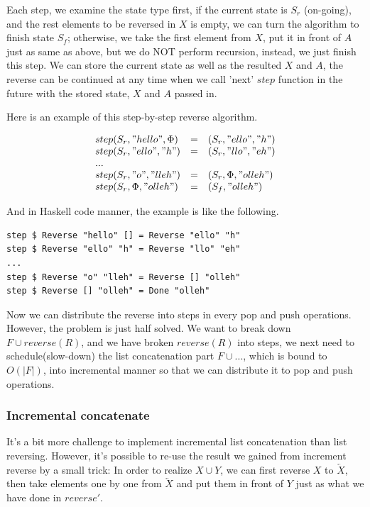 \documentclass[UTF8]{article}
\begin{document}
Each step, we examine the state type first, if the current state is
$S_r$ (on-going), and the rest elements to be reversed in $X$ is
empty, we can turn the algorithm to finish state $S_f$; otherwise,
we take the first element from $X$, put it in front of $A$ just
as same as above, but we do NOT perform recursion, instead, we
just finish this
step. We can store the current state as well as the resulted $X$
and $A$, the reverse can be continued at any time when we call 'next'
$step$ function in the future with the stored state, $X$ and $A$
passed in.

Here is an example of this step-by-step reverse algorithm.

\[
\begin{array}{lcl}
step(S_r, "hello", \Phi) & = & (S_r, "ello", "h") \\
step(S_r, "ello", "h") & = & (S_r, "llo", "eh") \\
... & & \\
step(S_r, "o", "lleh") & = & (S_r, \Phi, "olleh") \\
step(S_r, \Phi, "olleh") & = & (S_f, "olleh")
\end{array}
\]

And in Haskell code manner, the example is like the following.

\lstset{language=Haskell}
\begin{lstlisting}
step $ Reverse "hello" [] = Reverse "ello" "h"
step $ Reverse "ello" "h" = Reverse "llo" "eh"
...
step $ Reverse "o" "lleh" = Reverse [] "olleh"
step $ Reverse [] "olleh" = Done "olleh"
\end{lstlisting}

Now we can distribute the reverse into steps in every pop and push
operations. However, the problem is just half solved. We want to
break down $ F \cup reverse(R)$, and we have broken $reverse(R)$
into steps, we next need to schedule(slow-down) the list concatenation
part $F \cup ...$, which is bound to $O(|F|)$, into incremental
manner so that we can distribute it to pop and push operations.

\subsubsection{Incremental concatenate}

It's a bit more challenge to implement incremental list concatenation
than list reversing. However, it's possible to re-use the result
we gained from increment reverse by a small trick: In order to
realize $X \cup Y$, we can first reverse $X$ to $\overleftarrow{X}$,
then take elements one by one from $\overleftarrow{X}$ and put
them in front of $Y$ just as what we have done in $reverse'$.
\end{document}

